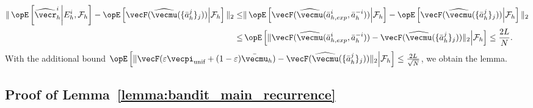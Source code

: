\begin{align*}
    \|\Exop \left[\widehat{\vecr}_h^i \middle|E_{h}^i, \mathcal{F}_h\right] - \Exop\left[ \vecF(\widehat{\vecmu}(\{ \bar{a}_h ^ j \}_j)) \middle| \mathcal{F}_h \right]\|_2 
    \leq & \|\Exop \left[\vecF(\widehat{\vecmu}(\bar{a}_{h,exp}^i, \bar{a}_h ^ {-i})) \middle| \mathcal{F}_h \right] - \Exop\left[ \vecF(\widehat{\vecmu}(\{ \bar{a}_h ^ j \}_j))  \middle| \mathcal{F}_h\right]\|_2 \\
    \leq & \Exop \left[\|\vecF(\widehat{\vecmu}(\bar{a}_{h,exp}^i, \bar{a}_h ^ {-i})) - \vecF(\widehat{\vecmu}(\{ \bar{a}_h ^ j \}_j)) \|_2 \middle| \mathcal{F}_h\right] \leq \frac{2 L }{N}.
\end{align*}
With the additional bound $\Exop \left[\|\vecF(\varepsilon \vecpi_\text{unif} + (1-\varepsilon) \bar{\vecmu}_h) - \vecF(\widehat{\vecmu}(\{ \bar{a}_h ^ j \}_j)) \|_2 \middle| \mathcal{F}_h \right] \leq \frac{2 L }{\sqrt{N}} $, we obtain the lemma.

\subsection{Proof of Lemma~\ref{lemma:bandit_main_recurrence}}\label{sec:proof_lemma_bandit_recurrence}

